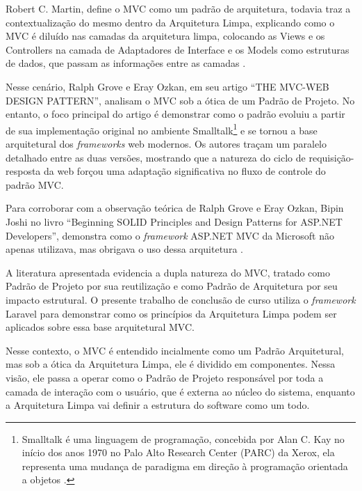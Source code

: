     \par Robert C. Martin, define o MVC como um padrão de arquitetura, todavia traz a contextualização do mesmo dentro da Arquitetura Limpa, explicando como o MVC é diluído nas camadas da arquitetura limpa, colocando as Views e os Controllers na camada de Adaptadores de Interface e os Models como estruturas de dados, que passam as informações entre as camadas \cite{livro:martin:cleanarch}.

    \par Nesse cenário, Ralph Grove e Eray Ozkan, em seu artigo ``THE MVC-WEB DESIGN PATTERN'', analisam o MVC sob a ótica de um Padrão de Projeto. No entanto, o foco principal do artigo é demonstrar como o padrão evoluiu a partir de sua implementação original no ambiente Smalltalk\footnote{Smalltalk é uma linguagem de programação, concebida por Alan C. Kay no início dos anos 1970 no Palo Alto Research Center (PARC) da Xerox, ela representa uma mudança de paradigma em direção à programação orientada a objetos \cite{livro:bergin:1996:history}.} e se tornou a base arquitetural dos \textit{frameworks} web modernos. Os autores traçam um paralelo detalhado entre as duas versões, mostrando que a natureza do ciclo de requisição-resposta da web forçou uma adaptação significativa no fluxo de controle do padrão MVC.

    \par Para corroborar com a observação teórica de Ralph Grove e Eray Ozkan, Bipin Joshi no livro ``Beginning SOLID Principles and Design Patterns for ASP.NET Developers'', demonstra como o \textit{framework} ASP.NET MVC da Microsoft não apenas utilizava, mas obrigava o uso dessa arquitetura \cite{livro:joshi:2016}.

    \par A literatura apresentada evidencia a dupla natureza do MVC, tratado como Padrão de Projeto por sua reutilização e como Padrão de Arquitetura por seu impacto estrutural. O presente trabalho de conclusão de curso utiliza o \textit{framework} Laravel para demonstrar como os princípios da Arquitetura Limpa podem ser aplicados sobre essa base arquitetural MVC. 
    
    \par Nesse contexto, o MVC é entendido incialmente como um Padrão Arquitetural, mas sob a ótica da Arquitetura Limpa, ele é dividido em componentes. Nessa visão, ele passa a operar como o Padrão de Projeto responsável por toda a camada de interação com o usuário, que é externa ao núcleo do sistema, enquanto a Arquitetura Limpa vai definir a estrutura do software como um todo.